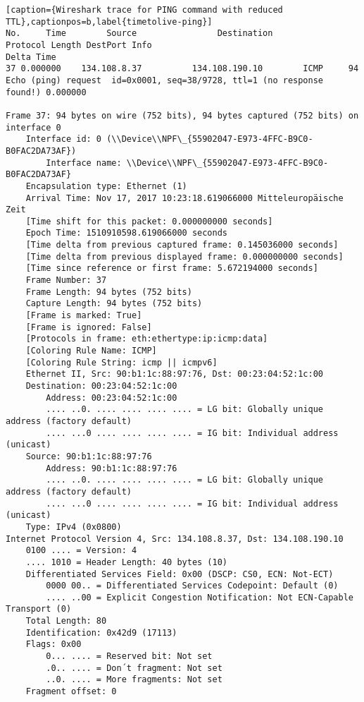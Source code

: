\begin{lstlisting}[caption={Wireshark trace for PING command with reduced TTL},captionpos=b,label{timetolive-ping}]
No.     Time        Source                Destination           Protocol Length DestPort Info                                                            Delta Time
37 0.000000    134.108.8.37          134.108.190.10        ICMP     94              Echo (ping) request  id=0x0001, seq=38/9728, ttl=1 (no response found!) 0.000000

Frame 37: 94 bytes on wire (752 bits), 94 bytes captured (752 bits) on interface 0
	Interface id: 0 (\\Device\\NPF\_{55902047-E973-4FFC-B9C0-B0FAC2DA73AF})
		Interface name: \\Device\\NPF\_{55902047-E973-4FFC-B9C0-B0FAC2DA73AF}
	Encapsulation type: Ethernet (1)
	Arrival Time: Nov 17, 2017 10:23:18.619066000 Mitteleuropäische Zeit
	[Time shift for this packet: 0.000000000 seconds]
	Epoch Time: 1510910598.619066000 seconds
	[Time delta from previous captured frame: 0.145036000 seconds]
	[Time delta from previous displayed frame: 0.000000000 seconds]
	[Time since reference or first frame: 5.672194000 seconds]
	Frame Number: 37
	Frame Length: 94 bytes (752 bits)
	Capture Length: 94 bytes (752 bits)
	[Frame is marked: True]
	[Frame is ignored: False]
	[Protocols in frame: eth:ethertype:ip:icmp:data]
	[Coloring Rule Name: ICMP]
	[Coloring Rule String: icmp || icmpv6]
	Ethernet II, Src: 90:b1:1c:88:97:76, Dst: 00:23:04:52:1c:00
	Destination: 00:23:04:52:1c:00
		Address: 00:23:04:52:1c:00
		.... ..0. .... .... .... .... = LG bit: Globally unique address (factory default)
		.... ...0 .... .... .... .... = IG bit: Individual address (unicast)
	Source: 90:b1:1c:88:97:76
		Address: 90:b1:1c:88:97:76
		.... ..0. .... .... .... .... = LG bit: Globally unique address (factory default)
		.... ...0 .... .... .... .... = IG bit: Individual address (unicast)
	Type: IPv4 (0x0800)
Internet Protocol Version 4, Src: 134.108.8.37, Dst: 134.108.190.10
	0100 .... = Version: 4
	.... 1010 = Header Length: 40 bytes (10)
	Differentiated Services Field: 0x00 (DSCP: CS0, ECN: Not-ECT)
		0000 00.. = Differentiated Services Codepoint: Default (0)
		.... ..00 = Explicit Congestion Notification: Not ECN-Capable Transport (0)
	Total Length: 80
	Identification: 0x42d9 (17113)
	Flags: 0x00
		0... .... = Reserved bit: Not set
		.0.. .... = Don´t fragment: Not set
		..0. .... = More fragments: Not set
	Fragment offset: 0

\end{lstlisting}
